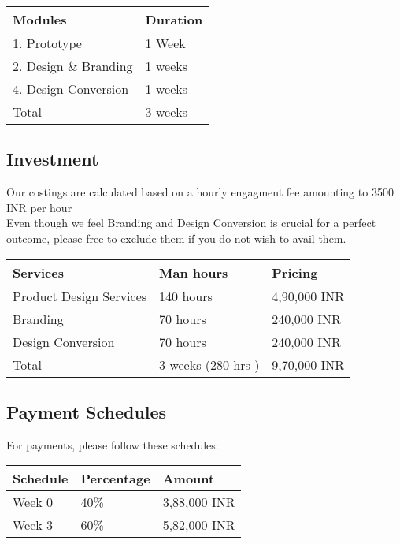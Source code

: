 \documentclass[a4paper,10pt]{article}
\newcommand{\head}[1]{\textnormal{\textbf{#1}}}
\begin{document}
	
		\begin{tabular}{ll}
			\hline
			\toprule[1.5pt]
			\head{Modules} & \head{Duration}\\
			\hline
			1. Prototype & 1 Week \\
			2. Design \& Branding  & 1 weeks\\
			4. Design Conversion  & 1 weeks\\
			\hline
			Total & 3 weeks \\
			\toprule[1.5pt]
		\end{tabular}
		
		
		\subsection{Investment}		
		
		Our costings are calculated based on a hourly engagment fee amounting to 3500 INR  per hour \\
		
		Even though we feel Branding and Design Conversion is crucial for a perfect outcome, please free to exclude them if you do not wish to avail them.\\
		
		\begin{tabular}{lll}
			\hline
			\toprule[1.5pt]
			\head{Services} & \head{Man hours} & \head{Pricing}\\
			\hline
			Product Design Services  & 140 hours &  4,90,000 INR\\
			Branding & 70 hours & 240,000 INR\\
			Design Conversion & 70 hours  & 240,000 INR\\
			\hline
			Total & 3 weeks (280 hrs ) & 9,70,000 INR\\
			\toprule[1.5pt]
		\end{tabular}

		\subsection{Payment Schedules}
		
		For payments, please follow these schedules:  \\
		
		\begin{tabular}{lll}
			\hline
			\toprule[1.5pt]
			\head{Schedule} & \head{Percentage} & \head{Amount}\\
			\hline
			Week 0 &  40\%  & 3,88,000 INR\\
			Week 3 &  60\%  & 5,82,000 INR\\
			\toprule[1.5pt]
		\end{tabular}
		
\end{document}
